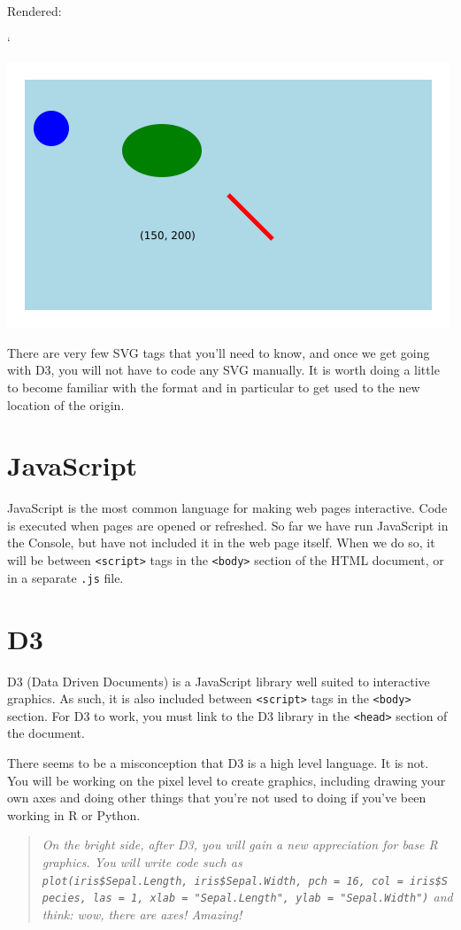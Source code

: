 \documentclass[openany]{book}
\begin{document}
Rendered:

`

\includegraphics[width=0.5\linewidth]{images/shapessvg}

There are very few SVG tags that you'll need to know, and once we get going with D3, you will not have to code any SVG manually. It is worth doing a little to become familiar with the format and in particular to get used to the new location of the origin.

\hypertarget{javascript}{%
\section{JavaScript }\label{javascript}}

JavaScript is the most common language for making web pages interactive. Code is executed when pages are opened or refreshed. So far we have run JavaScript in the Console, but have not included it in the web page itself. When we do so, it will be between \texttt{\textless{}script\textgreater{}} tags in the \texttt{\textless{}body\textgreater{}} section of the HTML document, or in a separate \texttt{.js} file.

\hypertarget{d3}{%
\section{D3 }\label{d3}}

D3 (Data Driven Documents) is a JavaScript library well suited to interactive graphics. As such, it is also included between \texttt{\textless{}script\textgreater{}} tags in the \texttt{\textless{}body\textgreater{}} section. For D3 to work, you must link to the D3 library in the \texttt{\textless{}head\textgreater{}} section of the document.

There seems to be a misconception that D3 is a high level language. It is not. You will be working on the pixel level to create graphics, including drawing your own axes and doing other things that you're not used to doing if you've been working in R or Python.

\begin{quote}
 \emph{On the bright side, after D3, you will gain a new appreciation for base R graphics. You will write code such as \texttt{plot(iris\$Sepal.Length,\ iris\$Sepal.Width,\ pch\ =\ 16,\ col\ =\ iris\$Species,\ las\ =\ 1,\ xlab\ =\ "Sepal.Length",\ ylab\ =\ "Sepal.Width")} and think: wow, there are axes! Amazing!}
\end{quote}
\end{document}
